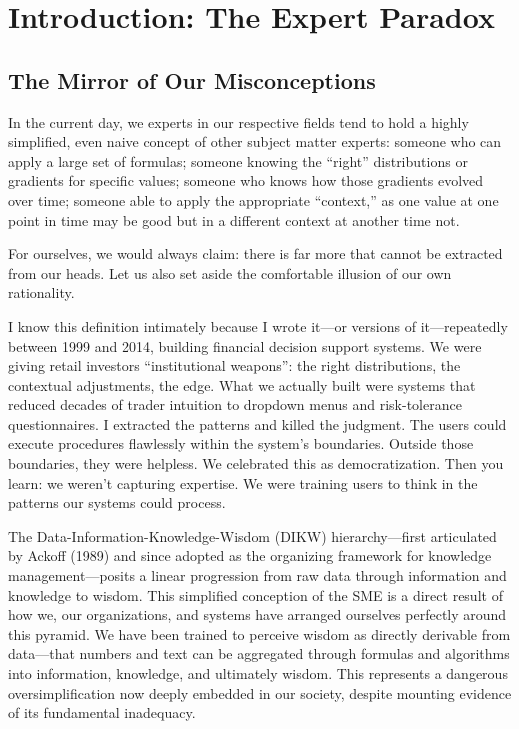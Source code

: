\section{Introduction: The Expert Paradox}

\subsection{The Mirror of Our Misconceptions}

In the current day, we experts in our respective fields tend to hold a highly simplified, even naive concept of other subject matter experts: someone who can apply a large set of formulas; someone knowing the ``right'' distributions or gradients for specific values; someone who knows how those gradients evolved over time; someone able to apply the appropriate ``context,'' as one value at one point in time may be good but in a different context at another time not.

For ourselves, we would always claim: there is far more that cannot be extracted from our heads. Let us also set aside the comfortable illusion of our own rationality.

I know this definition intimately because I wrote it---or versions of it---repeatedly between 1999 and 2014, building financial decision support systems. We were giving retail investors ``institutional weapons'': the right distributions, the contextual adjustments, the edge. What we actually built were systems that reduced decades of trader intuition to dropdown menus and risk-tolerance questionnaires. I extracted the patterns and killed the judgment. The users could execute procedures flawlessly within the system's boundaries. Outside those boundaries, they were helpless. We celebrated this as democratization. Then you learn: we weren't capturing expertise. We were training users to think in the patterns our systems could process.

The Data-Information-Knowledge-Wisdom (DIKW) hierarchy---first articulated by Ackoff (1989) and since adopted as the organizing framework for knowledge management---posits a linear progression from raw data through information and knowledge to wisdom. This simplified conception of the SME is a direct result of how we, our organizations, and systems have arranged ourselves perfectly around this pyramid. We have been trained to perceive wisdom as directly derivable from data---that numbers and text can be aggregated through formulas and algorithms into information, knowledge, and ultimately wisdom. This represents a dangerous oversimplification now deeply embedded in our society, despite mounting evidence of its fundamental inadequacy.

